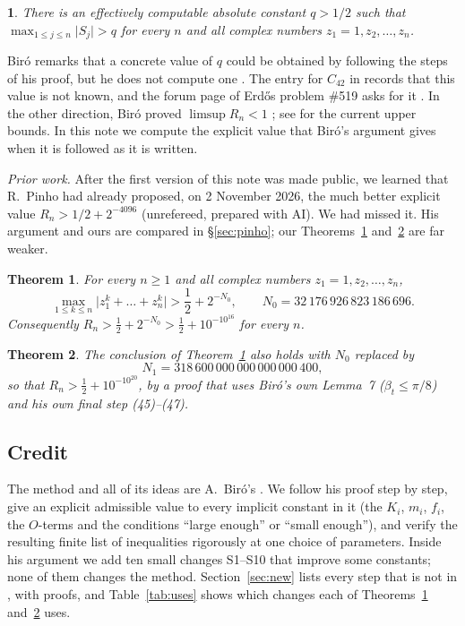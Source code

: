 \documentclass[11pt]{amsart}
\newtheorem{theorem}{Theorem}[section]
\theoremstyle{remark}
\theoremstyle{plain}
\newtheorem*{namedthm*}{\protect\mythmname}
\newcommand{\mythmname}{}
\newenvironment{named}[1]{\renewcommand{\mythmname}{#1}\begin{namedthm*}}{\end{namedthm*}}
\newcommand{\abs}[1]{\lvert #1\rvert}
\newcommand{\NO}{32\,176\,926\,823\,186\,696}
\newcommand{\NI}{318\,600\,000\,000\,000\,000\,400}
\begin{document}
\begin{named}{Theorem (Bir\'o \cite{Bir00b})}
There is an effectively computable absolute constant $q>1/2$ such that $\max_{1\le j\le n}\abs{S_j}>q$ for every $n$ and all complex numbers $z_1=1,z_2,\dots,z_n$.
\end{named}

Bir\'o remarks that a concrete value of $q$ could be obtained by following the steps of his proof, but he does not compute one \cite[\S1]{Bir00b}. The entry for $C_{42}$ in \cite{Tao} records that this value is not known, and the forum page of Erd\H{o}s problem \#519 asks for it \cite{Blo}. In the other direction, Bir\'o proved $\limsup R_n<1$ \cite{Bir00}; see \cite{Tao} for the current upper bounds. In this note we compute the explicit value that Bir\'o's argument gives when it is followed as it is written.

\emph{Prior work.} After the first version of this note was made public, we learned that R.~Pinho had already proposed, on 2 November 2026, the much better explicit value $R_n>1/2+2^{-4096}$ \cite{Pin310} (unrefereed, prepared with AI). We had missed it. His argument and ours are compared in \S\ref{sec:pinho}; our Theorems~\ref{thm:main} and~\ref{thm:cons} are far weaker.

\begin{theorem}\label{thm:main}
For every $n\ge1$ and all complex numbers $z_1=1,z_2,\dots,z_n$,
\[
  \max_{1\le k\le n}\abs{z_1^k+\dots+z_n^k}>\frac12+2^{-N_0},\qquad N_0=\NO .
\]
Consequently $R_n>\frac12+2^{-N_0}>\frac12+10^{-10^{16}}$ for every $n$.
\end{theorem}

\begin{theorem}\label{thm:cons}
The conclusion of Theorem~\ref{thm:main} also holds with $N_0$ replaced by
\[
N_1=\NI,
\]
so that $R_n>\frac12+10^{-10^{20}}$, by a proof that uses Bir\'o's own Lemma~7 ($\beta_t\le\pi/8$) and his own final step (45)--(47).
\end{theorem}

\subsection*{Credit}
The method and all of its ideas are A.~Bir\'o's \cite{Bir00b}. We follow his proof step by step, give an explicit admissible value to every implicit constant in it (the $K_i$, $m_i$, $f_i$, the $O$-terms and the conditions ``large enough'' or ``small enough''), and verify the resulting finite list of inequalities rigorously at one choice of parameters. Inside his argument we add ten small changes S1--S10 that improve some constants; none of them changes the method. Section~\ref{sec:new} lists every step that is not in \cite{Bir00b}, with proofs, and Table~\ref{tab:uses} shows which changes each of Theorems~\ref{thm:main} and~\ref{thm:cons} uses.
\end{document}
